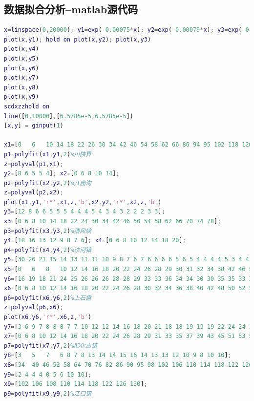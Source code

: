 \documentclass{whutmod}
\begin{document}
\subsection{数据拟合分析--matlab源代码}
\begin{lstlisting}[language=matlab]
x=linspace(0,20000); y1=exp(-0.00075*x); y2=exp(-0.00079*x); y3=exp(-0.00086*x); y4=exp(-0.00090*x); y5=exp(-0.00118*x); y6=exp(-0.00105*x); y7=exp(-0.00111*x); y8=exp(-0.00117*x); y9=exp(-0.00118*x);
plot(x,y1); hold on plot(x,y2); plot(x,y3) 
plot(x,y4)
plot(x,y5)
plot(x,y6)
plot(x,y7)
plot(x,y8)
plot(x,y9)
scdxzzhold on
line([0,10000],[6.5785e-5,6.5785e-5])
[x,y] = ginput(1)

x1=[0	6	10 14 18 22 26 30 34 42 46 54 58 62 66 86 94 95 102 118 126];
p1=polyfit(x1,y1,2)%川陕界
z=polyval(p1,x1);
y2=[8 6 5 5 4]; x2=[0 6 8 10 14];
p2=polyfit(x2,y2,2)%八庙沟
z=polyval(p2,x2);
plot(x1,y1,'r*',x1,z,'b',x2,y2,'r*',x2,z,'b')
y3=[12 8 6 6 5 5 5 4 4 4 5 4 3 4 3 2 2 2 3 3];
x3=[0 6 8 10 14 18 22 24 30 34 42 46 50 54 58 62 66 70 74 78];
p3=polyfit(x3,y3,2)%清风峡
y4=[18 16 13 12 9 8 7 6]; x4=[0 6 8 10 12 14 18 20];
p4=polyfit(x4,y4,2)%沙河镇
y5=[30 26 21 15 14 13 11 11 10 9 8 7 6 7 6 6 6 6 5 6 5 4 4 4 4 5 3 4 4 3 3 3 2 2 0 4];
x5=[0	6	8	10 12 14 16 18 20 22 24 26 28 29 30 31 32 34 38 42 46 50 54 58 62 66 70 74 78 86 94 95 102 110 118 126]; p5=polyfit(x5,y5,2)%千佛崖
y6=[16 19 18 21 24 25 26 26 26 28 28 29 33 33 36 34 34 30 30 35 35 33 34 31 30 32 29 24 22 20 23 18 17 19 21 18 17 18 17 16 14 15 14 13 12 12 10 9 9 8 8 8];
x6=[0 6 8 10 12 14 16 18 20 22 24 26 28 30 32 34 36 38 40 42 48 50 52 54 56 58 60 62 64 66 68 70 72 74 76 78 82 84 86 88 92 94 96 98 100 104 108 110 112 116 118 126];
p6=polyfit(x6,y6,2)%上石盘
z=polyval(p6,x6);
plot(x6,y6,'r*',x6,z,'b')
y7=[3 6 9 7 8 8 8 7 7 10 12 12 14 16 18 20 21 18 18 19 13 19 22 24 24 12 6 7 5 4 6 10 13 13 7 3 3 3 3 4 3 3 7 3 0 0 0 0 6];
x7=[0 6 8 10 12 14 16 18 20 22 24 26 28 29 31 33 35 37 39 43 45 51 53 55 57 59 61 65 67 69 71 73 77 81 83 85 89 92 94 96 98 100 102 108 110 112 116 118 126];
p7=polyfit(x7,y7,2)%昭化古镇
y8=[3	5	7	6 8 7 8 13 14 14 15 16 14 13 13 12 10 9 8 10 10];
x8=[34	40 46 52 58 64 70 76 82 86 90 95 98 102 106 110 114 118 122 126 130]; p8=polyfit(x8,y8,2)%张王乡
y9=[2 4 4 4 0 5 6 10 10];
x9=[102 106 108 110 114 118 122 126 130];
p9=polyfit(x9,y9,2)%江口镇

\end{lstlisting}
\end{document}
